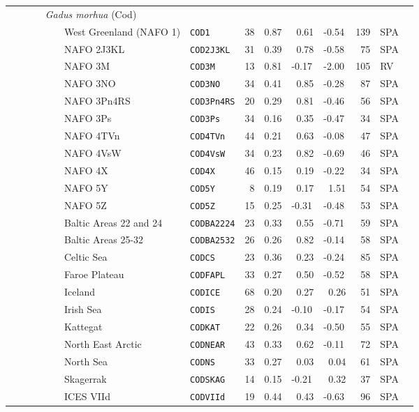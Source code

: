 \begin{flushleft}
\begin{tabular*}{7.1in}{llllllllll}
&{\it~~~~~Gadus morhua} (Cod)&~&~&~&~&~&~&~  & \\ 
&~~~~~~~~~West Greenland (NAFO 1)&{\tt COD1}&38&0.87&~0.61&-0.54&139&SPA  & \\ 
&~~~~~~~~~NAFO 2J3KL&{\tt COD2J3KL}&31&0.39&~0.78&-0.58&~75&SPA  & \\ 
&~~~~~~~~~NAFO 3M&{\tt COD3M}&13&0.81&-0.17&-2.00&105&RV  & \\ 
&~~~~~~~~~NAFO 3NO&{\tt COD3NO}&34&0.41&~0.85&-0.28&~87&SPA  & \\ 
&~~~~~~~~~NAFO 3Pn4RS&{\tt COD3Pn4RS}&20&0.29&~0.81&-0.46&~56&SPA  & \\ 
&~~~~~~~~~NAFO 3Ps&{\tt COD3Ps}&34&0.16&~0.35&-0.47&~34&SPA  & \\ 
&~~~~~~~~~NAFO 4TVn&{\tt COD4TVn}&44&0.21&~0.63&-0.08&~47&SPA  & \\ 
&~~~~~~~~~NAFO 4VsW&{\tt COD4VsW}&34&0.23&~0.82&-0.69&~46&SPA  & \\ 
&~~~~~~~~~NAFO 4X&{\tt COD4X}&46&0.15&~0.19&-0.22&~34&SPA  & \\ 
&~~~~~~~~~NAFO 5Y&{\tt COD5Y}&~8&0.19&~0.17&~1.51&~54&SPA  & \\ 
&~~~~~~~~~NAFO 5Z&{\tt COD5Z}&15&0.25&-0.31&-0.48&~53&SPA  & \\ 
&~~~~~~~~~Baltic Areas 22 and 24&{\tt CODBA2224}&23&0.33&~0.55&-0.71&~59&SPA  & \\ 
&~~~~~~~~~Baltic Areas 25-32&{\tt CODBA2532}&26&0.26&~0.82&-0.14&~58&SPA  & \\ 
&~~~~~~~~~Celtic Sea&{\tt CODCS}&23&0.36&~0.23&-0.24&~85&SPA  & \\ 
&~~~~~~~~~Faroe Plateau&{\tt CODFAPL}&33&0.27&~0.50&-0.52&~58&SPA  & \\ 
&~~~~~~~~~Iceland&{\tt CODICE}&68&0.20&~0.27&~0.26&~51&SPA  & \\ 
&~~~~~~~~~Irish Sea&{\tt CODIS}&28&0.24&-0.10&-0.17&~54&SPA  & \\ 
&~~~~~~~~~Kattegat&{\tt CODKAT}&22&0.26&~0.34&-0.50&~55&SPA  & \\ 
&~~~~~~~~~North East Arctic&{\tt CODNEAR}&43&0.33&~0.62&-0.11&~72&SPA  & \\ 
&~~~~~~~~~North Sea&{\tt CODNS}&33&0.27&~0.03&~0.04&~61&SPA  & \\ 
&~~~~~~~~~Skagerrak&{\tt CODSKAG}&14&0.15&-0.21&~0.32&~37&SPA  & \\ 
&~~~~~~~~~ICES VIId&{\tt CODVIId}&19&0.44&~0.43&-0.63&~96&SPA  & \\ 
\end{tabular*} 
\end{flushleft}
